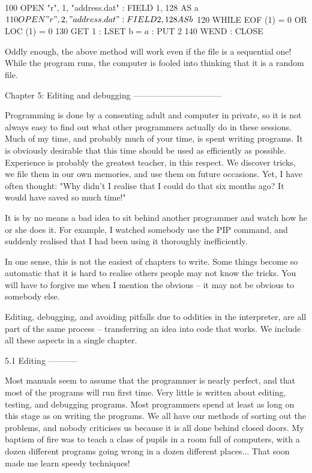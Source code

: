         100 OPEN "r", 1, "address.dat" : FIELD 1, 128 AS a$
        110 OPEN "r", 2, "address.dat" : FIELD 2, 128 AS b$
        120 WHILE EOF (1) = 0 OR LOC (1) = 0
        130       GET 1 : LSET b$ = a$ : PUT 2
        140 WEND : CLOSE

Oddly enough, the above method will work even if the file is a sequential one! 
While  the  program runs, the computer is fooled into thinking that  it  is  a 
random file.


Chapter 5: Editing and debugging
--------------------------------

Programming  is done by a consenting adult and computer in private, so  it  is 
not  always  easy  to find out what other programmers  actually  do  in  these 
sessions.  Much of my time, and probably much of your time, is  spent  writing 
programs.  It  is  obviously  desirable  that this  time  should  be  used  as 
efficiently as possible. Experience is probably the greatest teacher, in  this 
respect. We discover tricks, we file them in our own memories, and use them on 
future  occasions.  Yet, I have often thought: "Why didn't I  realise  that  I 
could do that six months ago? It would have saved so much time!"

It is by no means a bad idea to sit behind another programmer and watch how he 
or  she  does  it. For example, I watched somebody use the  PIP  command,  and 
suddenly realised that I had been using it thoroughly inefficiently.

In one sense, this is not the easiest of chapters to write. Some things become 
so automatic that it is hard to realise others people may not know the tricks. 
You  will  have  to forgive me when I mention the obvious --  it  may  not  be 
obvious to somebody else.

Editing, debugging, and avoiding pitfalls due to oddities in the  interpreter, 
are all part of the same process -- transferring an idea into code that works. 
We include all these aspects in a single chapter.


5.1 Editing
-----------

Most  manuals seem to assume that the programmer is nearly perfect,  and  that 
most  of  the  programs  will run first time. Very  little  is  written  about 
editing,  testing, and debugging programs. Most programmers spend at least  as 
long  on  this stage as on writing the programs. We all have  our  methods  of 
sorting  out  the problems, and nobody criticises us because it  is  all  done 
behind  closed doors. My baptism of fire was to teach a class of pupils  in  a 
room full of computers, with a dozen different programs going wrong in a dozen 
different places... That soon made me learn speedy techniques!

